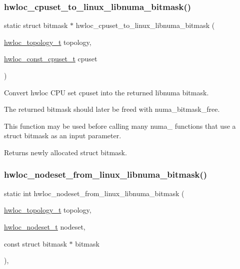 \subsubsection{\texorpdfstring{hwloc\+\_\+cpuset\+\_\+to\+\_\+linux\+\_\+libnuma\+\_\+bitmask()}{hwloc\_cpuset\_to\_linux\_libnuma\_bitmask()}}
{\footnotesize\ttfamily static struct bitmask $\ast$ hwloc\+\_\+cpuset\+\_\+to\+\_\+linux\+\_\+libnuma\+\_\+bitmask (\begin{DoxyParamCaption}\item[{\hyperlink{a00186_ga9d1e76ee15a7dee158b786c30b6a6e38}{hwloc\+\_\+topology\+\_\+t}}]{topology,  }\item[{\hyperlink{a00183_ga1f784433e9b606261f62d1134f6a3b25}{hwloc\+\_\+const\+\_\+cpuset\+\_\+t}}]{cpuset }\end{DoxyParamCaption})\hspace{0.3cm}{\ttfamily [static]}}



Convert hwloc C\+PU set {\ttfamily cpuset} into the returned libnuma bitmask. 

The returned bitmask should later be freed with numa\+\_\+bitmask\+\_\+free.

This function may be used before calling many numa\+\_\+ functions that use a struct bitmask as an input parameter.

\begin{DoxyReturn}{Returns}
newly allocated struct bitmask. 
\end{DoxyReturn}
\mbox{\label{a00216_gaaca6bff3086aad5bdbd2f4c5f0ad14cc}} 
\subsubsection{\texorpdfstring{hwloc\+\_\+nodeset\+\_\+from\+\_\+linux\+\_\+libnuma\+\_\+bitmask()}{hwloc\_nodeset\_from\_linux\_libnuma\_bitmask()}}
{\footnotesize\ttfamily static int hwloc\+\_\+nodeset\+\_\+from\+\_\+linux\+\_\+libnuma\+\_\+bitmask (\begin{DoxyParamCaption}\item[{\hyperlink{a00186_ga9d1e76ee15a7dee158b786c30b6a6e38}{hwloc\+\_\+topology\+\_\+t}}]{topology,  }\item[{\hyperlink{a00183_ga37e35730fa7e775b5bb0afe893d6d508}{hwloc\+\_\+nodeset\+\_\+t}}]{nodeset,  }\item[{const struct bitmask $\ast$}]{bitmask }\end{DoxyParamCaption})\hspace{0.3cm}{\ttfamily [inline]}, {\ttfamily [static]}}



